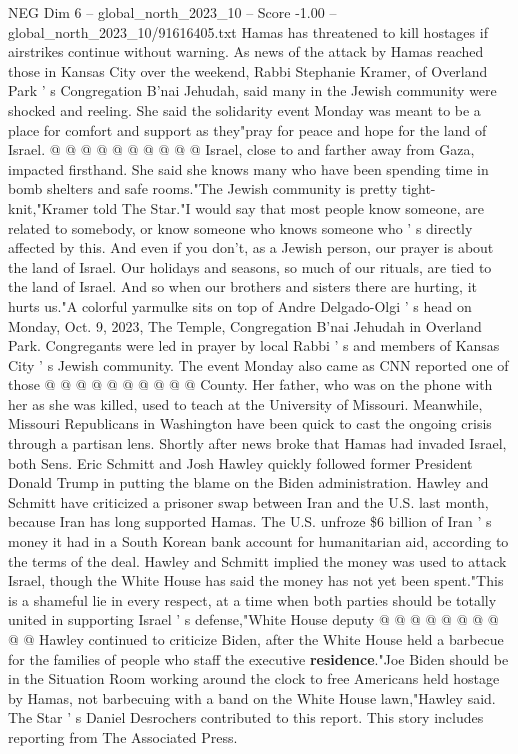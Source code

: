 \begin{textsample}{NEG Dim 6 – global\_north\_2023\_10 – Score -1.00 – global\_north\_2023\_10/91616405.txt}
Hamas has threatened to kill hostages if airstrikes continue without warning.
As news of the attack by Hamas reached those in Kansas City over the weekend, Rabbi Stephanie Kramer, of Overland Park ' s Congregation B'nai Jehudah, said many in the Jewish community were shocked and reeling.
She said the solidarity event Monday was meant to be a place for comfort and support as they"pray for peace and hope for the land of Israel. @ @ @ @ @ @ @ @ @ @ Israel, close to and farther away from Gaza, impacted firsthand.
She said she knows many who have been spending time in bomb shelters and safe rooms."The Jewish community is pretty tight-knit,"Kramer told The Star."I would say that most people know someone, are related to somebody, or know someone who knows someone who ' s directly affected by this.
And even if you don't, as a Jewish person, our prayer is about the land of Israel.
Our holidays and seasons, so much of our rituals, are tied to the land of Israel.
And so when our brothers and sisters there are hurting, it hurts us."A colorful yarmulke sits on top of Andre Delgado-Olgi ' s head on Monday, Oct. 9, 2023, The Temple, Congregation B'nai Jehudah in Overland Park.
Congregants were led in prayer by local Rabbi ' s and members of Kansas City ' s Jewish community.
The event Monday also came as CNN reported one of those @ @ @ @ @ @ @ @ @ @ County.
Her father, who was on the phone with her as she was killed, used to teach at the University of Missouri.
Meanwhile, Missouri Republicans in Washington have been quick to cast the ongoing crisis through a partisan lens.
Shortly after news broke that Hamas had invaded Israel, both Sens.
Eric Schmitt and Josh Hawley quickly followed former President Donald Trump in putting the blame on the Biden administration.
Hawley and Schmitt have criticized a prisoner swap between Iran and the U.S. last month, because Iran has long supported Hamas.
The U.S. unfroze \$6 billion of Iran ' s money it had in a South Korean bank account for humanitarian aid, according to the terms of the deal.
Hawley and Schmitt implied the money was used to attack Israel, though the White House has said the money has not yet been spent."This is a shameful lie in every respect, at a time when both parties should be totally united in supporting Israel ' s defense,"White House deputy @ @ @ @ @ @ @ @ @ @ Hawley continued to criticize Biden, after the White House held a barbecue for the families of people who staff the executive \textbf{residence}."Joe Biden should be in the Situation Room working around the clock to free Americans held hostage by Hamas, not barbecuing with a band on the White House lawn,"Hawley said.
The Star ' s Daniel Desrochers contributed to this report.
This story includes reporting from The Associated Press.

\end{textsample}
